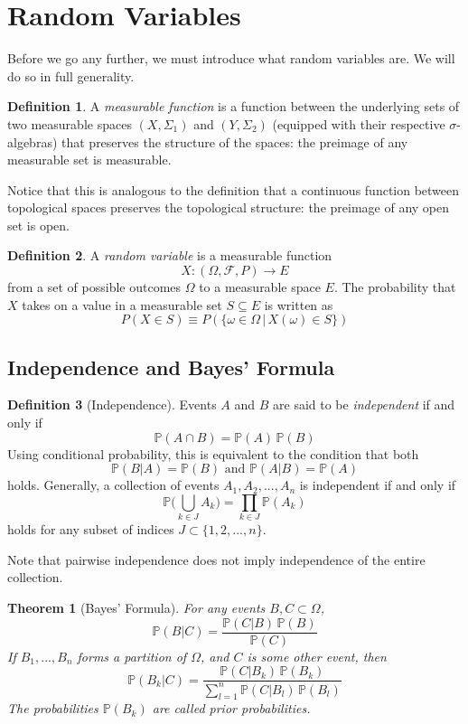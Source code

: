 \documentclass{article}
\newtheorem{theorem}{Theorem}[section]
\theoremstyle{remark}
\theoremstyle{definition}
\newtheorem{definition}{Definition}[section]
\begin{document}
\section{Random Variables}
Before we go any further, we must introduce what random variables are. We will do so in full generality. 

\begin{definition}
A \textit{measurable function} is a function between the underlying sets of two measurable spaces $(X, \Sigma_1)$ and $(Y, \Sigma_2)$ (equipped with their respective $\sigma$-algebras) that preserves the structure of the spaces: the preimage of any measurable set is measurable. 

Notice that this is analogous to the definition that a continuous function between topological spaces preserves the topological structure: the preimage of any open set is open. 
\end{definition}

\begin{definition}
A \textit{random variable} is a measurable function 
\[X: (\Omega, \mathcal{F}, P) \longrightarrow E\]
from a set of possible outcomes $\Omega$ to a measurable space $E$. The probability that $X$ takes on a value in a measurable set $S \subseteq E$ is written as 
\[P(X \in S) \equiv P( \{\omega \in \Omega \,|\, X (\omega) \in S\})\]
\end{definition}


\subsection{Independence and Bayes' Formula}
\begin{definition}[Independence]
Events $A$ and $B$ are said to be \textit{independent} if and only if 
\[\mathbb{P}(A \cap B) = \mathbb{P}(A)\, \mathbb{P}(B)\]
Using conditional probability, this is equivalent to the condition that both 
\[\mathbb{P}(B|A) = \mathbb{P}(B) \text{ and } \mathbb{P}(A|B) = \mathbb{P}(A)\]
holds. Generally, a collection of events $A_1, A_2, ..., A_n$ is independent if and only if 
\[\mathbb{P} \bigg( \bigcup_{k \in J} A_k \bigg) = \prod_{k\in J} \mathbb{P}(A_k)\]
holds for any subset of indices $J \subset \{1, 2, ..., n\}$. 
\end{definition}

Note that pairwise independence does not imply independence of the entire collection. 

\begin{theorem}[Bayes' Formula]
For any events $B, C \subset \Omega$, 
\[\mathbb{P}(B|C) = \frac{\mathbb{P}(C|B)\, \mathbb{P}(B)}{\mathbb{P}(C)}\]
If $B_1,..., B_n$ forms a partition of $\Omega$, and $C$ is some other event, then 
\[\mathbb{P}(B_k|C) = \frac{\mathbb{P}(C|B_k) \, \mathbb{P}(B_k)}{\sum_{l=1}^n \mathbb{P}(C|B_l) \, \mathbb{P}(B_l)}\]
The probabilities $\mathbb{P}(B_k)$ are called \textit{prior probabilities}. 
\end{theorem}
\end{document}
